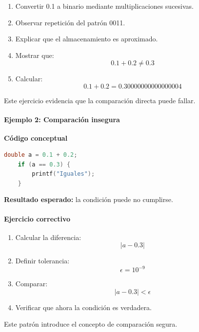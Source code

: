 \documentclass[12pt,twoside]{book}
\begin{document}
						\begin{enumerate}
							\item Convertir 0.1 a binario mediante multiplicaciones sucesivas.
							\item Observar repetición del patrón 0011.
							\item Explicar que el almacenamiento es aproximado.
							\item Mostrar que:
							\[
							0.1 + 0.2 \neq 0.3
							\]
							\item Calcular:
							\[
							0.1 + 0.2 = 0.30000000000000004
							\]
						\end{enumerate}
						
						\noindent
						Este ejercicio evidencia que la comparación directa puede fallar.
						
						\paragraph{Ejemplo 2: Comparación insegura}
						
						\noindent
						\textbf{Código conceptual}
						
						\begin{lstlisting}[language=C]
	double a = 0.1 + 0.2;
	if (a == 0.3) {
		printf("Iguales");
	} \end{lstlisting}
						
						\noindent
						\textbf{Resultado esperado:} la condición puede no cumplirse.
						
						\paragraph{Ejercicio correctivo}
						
						\begin{enumerate}
							\item Calcular la diferencia:
							\[
							|a - 0.3|
							\]
							\item Definir tolerancia:
							\[
							\epsilon = 10^{-9}
							\]
							\item Comparar:
							\[
							|a - 0.3| < \epsilon
							\]
							\item Verificar que ahora la condición es verdadera.
						\end{enumerate}
						
						\noindent
						Este patrón introduce el concepto de comparación segura.
						
\end{document}
